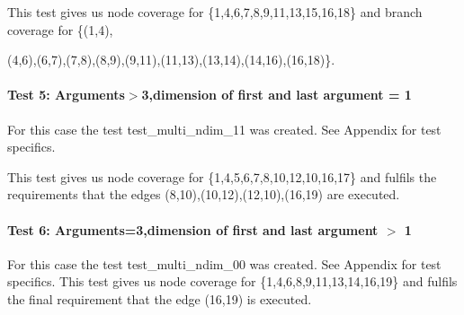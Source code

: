 This test gives us node coverage for \{1,4,6,7,8,9,11,13,15,16,18\} and branch coverage for \{(1,4),

(4,6),(6,7),(7,8),(8,9),(9,11),(11,13),(13,14),(14,16),(16,18)\}.



\paragraph{Test 5: Arguments$>$3,dimension of first and last argument = 1}

For this case the test test\_multi\_ndim\_11 was created. See Appendix for test specifics.

This test gives us node coverage for \{1,4,5,6,7,8,10,12,10,16,17\} and fulfils the requirements that the edges {(8,10),(10,12),(12,10),(16,19)} are executed.


\paragraph{Test 6: Arguments=3,dimension of first and last argument $>$ 1}


For this case the test test\_multi\_ndim\_00 was created. See Appendix for test specifics.
This test gives us node coverage for \{1,4,6,8,9,11,13,14,16,19\} and fulfils the final requirement that the edge (16,19) is executed.


